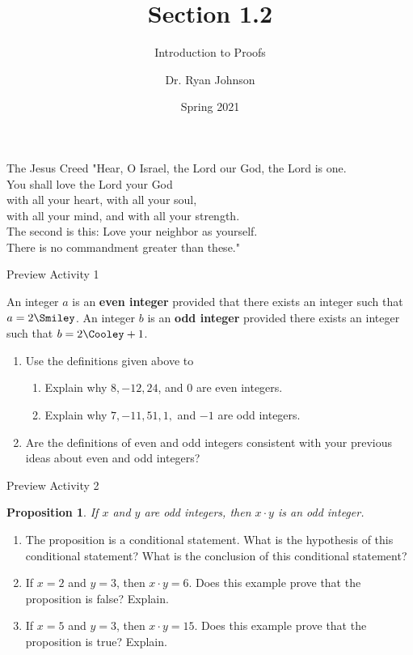 \documentclass{beamer}
\title{Section 1.2}
\subtitle{Introduction to Proofs}
\author{Dr. Ryan Johnson}
\institute{Grace College}
\date{Spring 2021}
\newtheorem{prop}[theorem]{Proposition}
\begin{document}
\begin{frame}[plain]
    \maketitle
\end{frame}

\begin{frame}{The Jesus Creed}
\Large{
"Hear, O Israel, the Lord our God, the Lord is one.\\
You shall love the Lord your God\\
\;\; with all your heart, with all your soul,\\
\;\; with all your mind, and with all your strength.\\
The second is this: Love your neighbor as yourself.\\
There is no commandment greater than these."
}
\end{frame}

\begin{frame}{Preview Activity 1}
	
	\begin{definition}
		An integer $a$ is an \textbf{even integer} provided that there exists an integer \Smiley such that $a = 2\Smiley$.  An integer $b$ is an \textbf{odd integer} provided there exists an integer \Cooley such that $b = 2\Cooley + 1$.
	\end{definition}
	\begin{enumerate}
		\item Use the definitions given above to
		\begin{enumerate}
			\item Explain why $8, -12, 24$, and 0 are even integers.
			\item Explain why $7, -11, 51, 1,$ and $-1$ are odd integers.
		\end{enumerate}
	\item Are the definitions of even and odd integers consistent with your previous ideas about even and odd integers?
	\end{enumerate}
\end{frame}

\begin{frame}{Preview Activity 2}
	\begin{prop}
		If $x$ and $y$ are odd integers, then $x \cdot y$ is an odd integer.
	\end{prop}

	\begin{enumerate}
		\item The proposition is a conditional statement. What is the hypothesis of this conditional statement? What is the conclusion of this conditional statement? \pause
		\item If $x = 2$ and $y = 3$, then $x \cdot y = 6$. Does this example prove that the proposition is false? Explain. \pause
		\item If $x = 5$ and $y = 3$, then $x \cdot y = 15$. Does this example prove that the proposition is true? Explain.
	\end{enumerate}
\end{frame}
\end{document}
